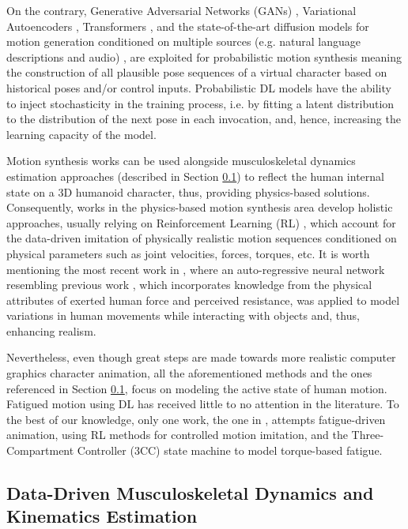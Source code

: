 On the contrary, Generative Adversarial Networks (GANs) \cite{Men2021, Mourot2022}, Variational Autoencoders \cite{Cai2021, Zhou2023}, Transformers \cite{Hou2024, Chai2024}, and the state-of-the-art diffusion models for motion generation conditioned on multiple sources (e.g. natural language descriptions and audio) \cite{Raab2023, Alexanderson2023, Dabral2023, Gao2024}, are exploited for probabilistic motion synthesis meaning the construction of all plausible pose sequences of a virtual character based on historical poses and/or control inputs. Probabilistic DL models have the ability to inject stochasticity in the training process, i.e. by fitting a latent distribution to the distribution of the next pose in each invocation, and, hence, increasing the learning capacity of the model.

Motion synthesis works can be used alongside musculoskeletal dynamics estimation approaches (described in Section \ref{sec:Musculoskeletal}) to reflect the human internal state on a 3D humanoid character, thus, providing physics-based solutions. Consequently, works in the physics-based motion synthesis area develop holistic approaches, usually relying on Reinforcement Learning (RL) \cite{Lee2021, Luo2024}, which account for the data-driven imitation of physically realistic motion sequences conditioned on physical parameters such as joint velocities, forces, torques, etc. It is worth mentioning the most recent work in \cite{Zhang2024}, where an auto-regressive neural network resembling previous work \cite{Starke2019, Starke2020, Starke2021}, which incorporates knowledge from the physical attributes of exerted human force and perceived resistance, was applied to model variations in human movements while interacting with objects and, thus, enhancing realism.

Nevertheless, even though great steps are made towards more realistic computer graphics character animation, all the aforementioned methods and the ones referenced in Section \ref{sec:Musculoskeletal}, focus on modeling the active state of human motion. Fatigued motion using DL has received little to no attention in the literature. To the best of our knowledge, only one work, the one in \cite{Cheema2023}, attempts fatigue-driven animation, using RL methods for controlled motion imitation, and the Three-Compartment Controller (3CC) state machine to model torque-based fatigue. 

\subsection{Data-Driven Musculoskeletal Dynamics and Kinematics Estimation}
\label{sec:Musculoskeletal}

